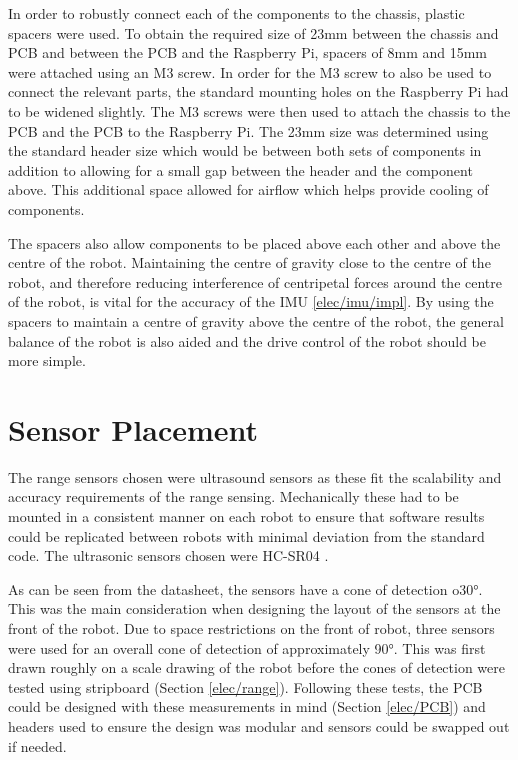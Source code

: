In order to robustly connect each of the components to the 
chassis, plastic spacers were used. To obtain the required size 
of 23mm  between the chassis and PCB 
and between the PCB and the Raspberry Pi, spacers of 8mm and 15mm 
were attached using an M3 screw. In order for the M3 screw to also 
be used to connect the relevant parts, the standard mounting holes 
on the Raspberry Pi had to be widened slightly. The M3 screws were 
then used to attach the chassis to the PCB and the PCB to the 
Raspberry Pi. The 23mm size was determined using the standard 
header size which would be between both sets of components in 
addition to allowing for a small gap between the header and the 
component above. This additional space allowed for airflow which 
helps provide cooling of components. 

The spacers also allow components to be placed above each other 
and above the centre of the robot. Maintaining the centre of 
gravity close to the centre of the robot, and therefore reducing 
interference of centripetal forces around the centre of the robot, 
is vital for the accuracy of the IMU \ref{elec/imu/impl}. By using 
the spacers to maintain a centre of gravity above the centre of the 
robot, the general balance of the robot is also aided and the drive 
control of the robot should be more simple.    

\section{Sensor Placement}\label{mech/sensors}
The range sensors chosen were ultrasound sensors as these fit the
scalability and accuracy requirements of the range sensing. 
Mechanically these had to be mounted in a consistent manner on each 
robot to ensure that software results could be replicated between 
robots with minimal deviation from the standard code. The ultrasonic 
sensors chosen were HC-SR04 .

As can be seen from the datasheet, the sensors have a cone of 
detection o\ang{30}. This was the main consideration when designing 
the layout of the sensors at the front of the robot. Due to space 
restrictions on the front of robot, three sensors were used for an 
overall cone of detection of approximately \ang{90}. This was first 
drawn roughly on a scale drawing of the robot before the cones of 
detection were tested using stripboard (Section \ref{elec/range}). 
Following these tests, the PCB could be designed with these measurements 
in mind (Section \ref{elec/PCB}) and headers used to ensure the design 
was modular and sensors could be swapped out if needed. 


